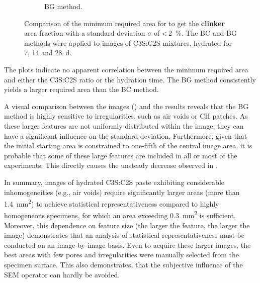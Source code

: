 \begin{figure}[htbp]
\begin{subfigure}[b]{0.49\textwidth}
        \caption{
            \ac{BG} method.
        }
        \label{fig:areagrowth_clinker}
    \end{subfigure}
    \caption{
        Comparison of the minimum required area for to get the \textbf{clinker} area fraction with a standard deviation $\sigma$ of <\,\qty{2}{\percent}.
        The \ac{BC} and \ac{BG} methods were applied to images of \ac{C3S}:\ac{C2S} mixtures, hydrated for \num{7}, \num{14} and \qty{28}{\day}.
    }
    \label{fig:box_statistics_clinker}
\end{figure}

The plots indicate no apparent correlation between the minimum required area and either the \ac{C3S}:\ac{C2S} ratio or the hydration time.
The \ac{BG} method consistently yields a larger required area than the \ac{BC} method.

A visual comparison between the images () and the results reveals that the \ac{BG} method is highly sensitive to irregularities, such as air voids or \ac{CH} patches.
As these larger features are not uniformly distributed within the image, they can have a significant influence on the standard deviation.
Furthermore, given that the initial starting area is constrained to one-fifth of the central image area, it is probable that some of these large features are included in all or most of the experiments.
This directly causes the unsteady decrease observed in .

In summary, images of hydrated \ac{C3S}:\ac{C2S} paste exhibiting considerable inhomogeneities (e.g., air voids) require significantly larger areas (more than \qty{1.4}{\milli\meter\squared}) to achieve statistical representativeness compared to highly homogeneous specimens, for which an area exceeding \qty{0.3}{\milli\meter\squared} is sufficient.
Moreover, this dependence on feature size (the larger the feature, the larger the image) demonstrates that an analysis of statistical representativeness must be conducted on an image-by-image basis.
Even to acquire these larger images, the best areas with few pores and irregularities were manually selected from the specimen surface.
This also demonstrates, that the subjective influence of the \ac{SEM} operator can hardly be avoided.


